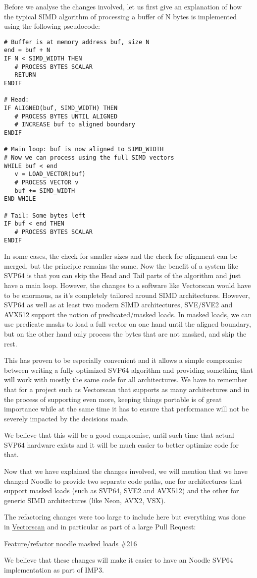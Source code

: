 Before we analyse the changes involved, let us first give an explanation of how the typical SIMD algorithm of processing a buffer of N bytes is implemented using the following pseudocode:

\begin{verbatim}
# Buffer is at memory address buf, size N
end = buf + N
IF N < SIMD_WIDTH THEN
   # PROCESS BYTES SCALAR
   RETURN
ENDIF

# Head:
IF ALIGNED(buf, SIMD_WIDTH) THEN
   # PROCESS BYTES UNTIL ALIGNED
   # INCREASE buf to aligned boundary
ENDIF

# Main loop: buf is now aligned to SIMD_WIDTH
# Now we can process using the full SIMD vectors
WHILE buf < end
   v = LOAD_VECTOR(buf)
   # PROCESS VECTOR v
   buf += SIMD_WIDTH
END WHILE

# Tail: Some bytes left
IF buf < end THEN
   # PROCESS BYTES SCALAR
ENDIF
\end{verbatim}

In some cases, the check for smaller sizes and the check for alignment can be merged, but the principle remains the same.
Now the benefit of a system like SVP64 is that you can skip the Head and Tail parts of the algorithm and just have a main loop.
However, the changes to a software like Vectorscan would have to be enormous, as it's completely tailored around SIMD architectures.
However, SVP64 as well as at least two modern SIMD architectures, SVE/SVE2 and AVX512 support the notion of predicated/masked loads.
In masked loads, we can use predicate masks to load a full vector on one hand until the aligned boundary, but on the other hand only process the bytes that are not masked, and skip the rest.

This has proven to be especially convenient and it allows a simple compromise between writing a fully optimized SVP64 algorithm and providing something that will work with mostly the same code for all architectures.
We have to remember that for a project such as Vectorscan that supports as many architectures and in the process of supporting even more, keeping things portable is of great importance while at the same time it has to ensure that performance will not be severely impacted by the decisions made.

We believe that this will be a good compromise, until such time that actual SVP64 hardware exists and it will be much easier to better optimize code for that.

Now that we have explained the changes involved, we will mention that we have changed Noodle to provide two separate code paths, one for architectures that support masked loads (such as SVP64, SVE2 and AVX512) and the other for generic SIMD architectures (like Neon, AVX2, VSX).

The refactoring changes were too large to include here but everything was done in \href{https://github.com/VectorCamp/vectorscan}{Vectorscan} and in particular as part of a large Pull Request:

\href{https://github.com/VectorCamp/vectorscan/pull/216}{Feature/refactor noodle masked loads \#216}

We believe that these changes will make it easier to have an Noodle SVP64 implementation as part of IMP3.

\clearpage
